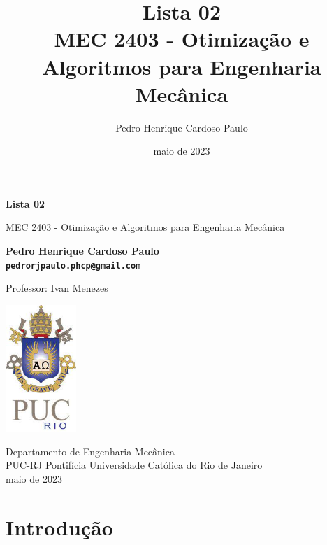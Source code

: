 \documentclass[10pt, a4paper]{article}
\begin{document}
\def\TITLE{Lista 02}
\def\DISCIPLINE{MEC 2403 - Otimização e Algoritmos para Engenharia Mecânica}
\def\PROFESSOR{Ivan Menezes}
\def\AUTHOR{Pedro Henrique Cardoso Paulo}
\def\CONTACT{pedrorjpaulo.phcp@gmail.com}
\def\DATE{maio de 2023}

\title{\textbf{\TITLE} \\ \DISCIPLINE}
\author{\AUTHOR}
\date{\DATE}

\begin{titlepage}
      \begin{center}
          \vspace*{1cm}

          \Huge
          \textbf{\TITLE}

          \vspace{0.5cm}
          \LARGE
          \DISCIPLINE

          \vspace{1.5cm}

          \textbf{\AUTHOR \\ {\tt \CONTACT}}

          \vfill
          Professor: \PROFESSOR

          \vspace{0.8cm}

          \includegraphics[width=0.2\textwidth]{../general/puc.jpg}

          \Large
          Departamento de Engenharia Mecânica\\
          PUC-RJ Pontifícia Universidade Católica do Rio de Janeiro\\
          \DATE

      \end{center}
  \end{titlepage}

\maketitle

\section{Introdução}
\end{document}
